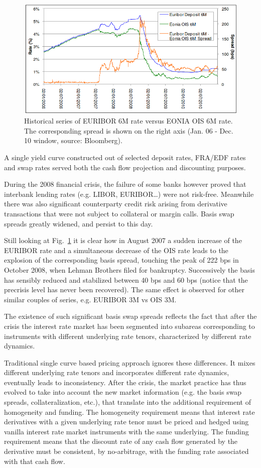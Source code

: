 \begin{figure}[htb]
	\centering
	\includegraphics[width=0.9\linewidth]{figures/credit_crunch.png}
	\caption{Historical series of EURIBOR 6M rate versus EONIA OIS 6M rate. The corresponding spread 
		is shown on the right axis (Jan. 06 - Dec. 10 window, source: Bloomberg).}
	\label{fig:credit_crunch}
\end{figure}

A single yield curve constructed out of selected deposit rates, FRA/EDF rates and swap rates served both the cash flow projection and discounting purposes.

During the 2008 financial crisis, the failure of some banks however proved that interbank lending rates (e.g. LIBOR, EURIBOR\ldots) were not risk-free. Meanwhile there was also significant counterparty credit risk arising from derivative transactions that were not subject to collateral or margin calls. Basis swap spreads greatly widened, and persist to this day. 

Still looking at Fig.~\ref{fig:credit_crunch} it is clear how in August 2007 a sudden increase of the EURIBOR rate and a simultaneous decrease of the OIS rate leads to the explosion of the corresponding basis spread, touching the peak of 222 bps in October 2008, when Lehman Brothers filed for bankruptcy. Successively the basis has sensibly reduced and stabilized between 40 bps and 60 bps (notice that the precrisis level has never been recovered). The same effect is observed for other similar couples of series, e.g. EURIBOR 3M vs OIS 3M.

The existence of such significant basis swap spreads reflects the fact that after the crisis the interest rate market has been segmented into subareas corresponding to instruments with different underlying rate tenors, characterized by different rate dynamics. 

Traditional single curve based pricing approach ignores these differences. It mixes different underlying rate tenors and incorporates different rate dynamics, eventually leads to inconsistency.
After the crisis, the market practice has thus evolved to take into account the new market information (e.g. the basis swap spreads, collateralization, etc.), that translate into the additional requirement of homogeneity and funding. The homogeneity requirement means that interest rate derivatives with a given underlying rate tenor must be priced and hedged using vanilla interest rate market instruments with the same underlying. The funding requirement means that the discount rate of any cash flow generated by the derivative must be consistent, by no-arbitrage, with the funding rate associated with that cash flow. 

